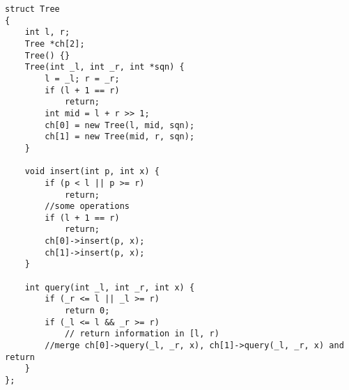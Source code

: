 \begin{lstlisting}
struct Tree
{
	int l, r;
	Tree *ch[2];
	Tree() {}
	Tree(int _l, int _r, int *sqn) {
		l = _l; r = _r;
		if (l + 1 == r)
			return;
		int mid = l + r >> 1;
		ch[0] = new Tree(l, mid, sqn);
		ch[1] = new Tree(mid, r, sqn);
	}
	
	void insert(int p, int x) {
		if (p < l || p >= r)
			return;
		//some operations
		if (l + 1 == r)
			return;
		ch[0]->insert(p, x);
		ch[1]->insert(p, x);
	}
	
	int query(int _l, int _r, int x) {
		if (_r <= l || _l >= r)
			return 0;
		if (_l <= l && _r >= r)
			// return information in [l, r)
		//merge ch[0]->query(_l, _r, x), ch[1]->query(_l, _r, x) and return
	}
};
\end{lstlisting}
